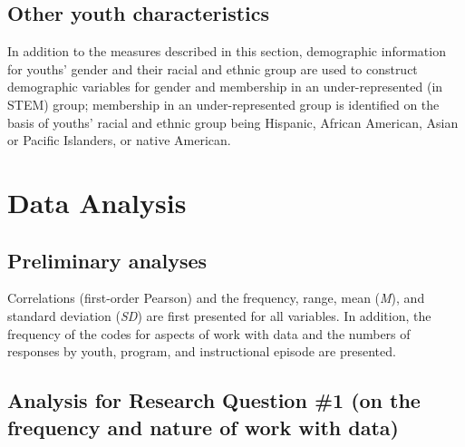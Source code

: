 \documentclass[]{book}
\theoremstyle{definition}
\theoremstyle{definition}
\theoremstyle{definition}
\theoremstyle{remark}
\begin{document}
\begin{table}

\caption{\label{tab:unnamed-chunk-6}Measure for pre-program interest in STEM}
\centering
{}
\end{table}

\subsection{Other youth
characteristics}\label{other-youth-characteristics}

In addition to the measures described in this section, demographic
information for youths' gender and their racial and ethnic group are
used to construct demographic variables for gender and membership in an
under-represented (in STEM) group; membership in an under-represented
group is identified on the basis of youths' racial and ethnic group
being Hispanic, African American, Asian or Pacific Islanders, or native
American.

\section{Data Analysis}\label{data-analysis}

\subsection{Preliminary analyses}\label{preliminary-analyses}

Correlations (first-order Pearson) and the frequency, range, mean
(\emph{M}), and standard deviation (\emph{SD}) are first presented for
all variables. In addition, the frequency of the codes for aspects of
work with data and the numbers of responses by youth, program, and
instructional episode are presented.

\subsection{Analysis for Research Question \#1 (on the frequency and
nature of work with
data)}\label{analysis-for-research-question-1-on-the-frequency-and-nature-of-work-with-data}
\end{document}
